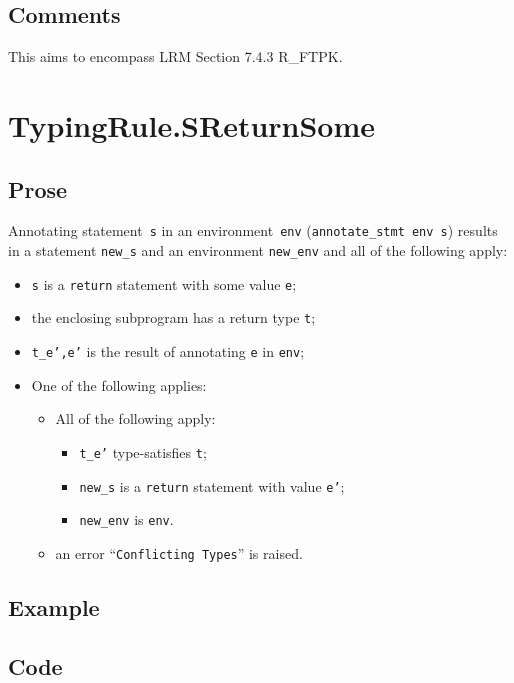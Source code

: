 \documentclass{book}
\begin{document}
\subsection{Comments}
    This aims to encompass LRM Section 7.4.3 R\_FTPK.
    
\section{TypingRule.SReturnSome \label{sec:TypingRule.SReturnSome}}

  \subsection{Prose}
Annotating statement~\texttt{s} in an environment~\texttt{env}
(\texttt{annotate\_stmt env s}) results in a statement \texttt{new\_s} and an
environment \texttt{new\_env} and all of the following apply:
   \begin{itemize}
   \item \texttt{s} is a \texttt{return} statement with some value \texttt{e};
   \item the enclosing subprogram has a return type \texttt{t};
   \item \texttt{t\_e',e'} is the result of annotating \texttt{e} in \texttt{env};
   \item One of the following applies:
     \begin{itemize}
     \item All of the following apply:
       \begin{itemize}
       \item \texttt{t\_e'} type-satisfies \texttt{t};
       \item \texttt{new\_s} is a \texttt{return} statement with value \texttt{e'};
       \item \texttt{new\_env} is \texttt{env}. 
       \end{itemize}
     \item an error ``\texttt{Conflicting Types}'' is raised.
     \end{itemize}
   \end{itemize}

  \subsection{Example}

  \subsection{Code}
\end{document}
